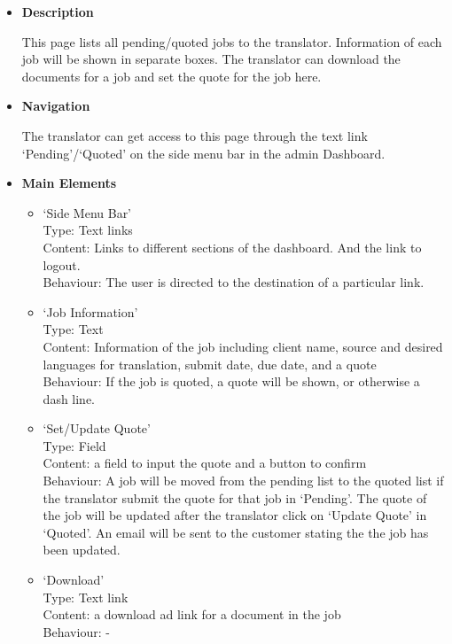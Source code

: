 \documentclass{l3proj}
\begin{document}
\begin{itemize}
\item \textbf{Description}

This page lists all pending/quoted jobs to the translator. Information of each job will be shown in separate boxes. 
The translator can download the documents for a job and set the quote for the job here.

\item \textbf{Navigation}

The translator can get access to this page through the text link
`Pending'/`Quoted' on the side menu bar in the admin Dashboard.

\item \textbf{Main Elements}
\begin{itemize}
\item `Side Menu Bar'\\
Type: Text links\\
Content: Links to different sections of the dashboard. And the link to logout. \\
Behaviour: The user is directed to the destination of a particular link. \\

\item `Job Information'\\
Type: Text\\
Content: Information of the job including client name, source and desired languages for translation, submit date, due date, and a quote \\
Behaviour: If the job is quoted, a quote will be shown, or otherwise a dash line. \\

\item `Set/Update Quote'\\
Type: Field\\
Content: a field to input the quote and a button to confirm \\
Behaviour: A job will be moved from the pending list to the quoted list if the translator submit the quote for that job in `Pending'. The quote of the job will be updated after the translator click on `Update Quote' in `Quoted'. An email will be sent to the customer stating the the job has been updated.\\

\item `Download'\\
Type: Text link\\
Content: a download
ad link for a document in the job\\
Behaviour: -\\
\end{itemize}
\end{itemize}
\end{document}
